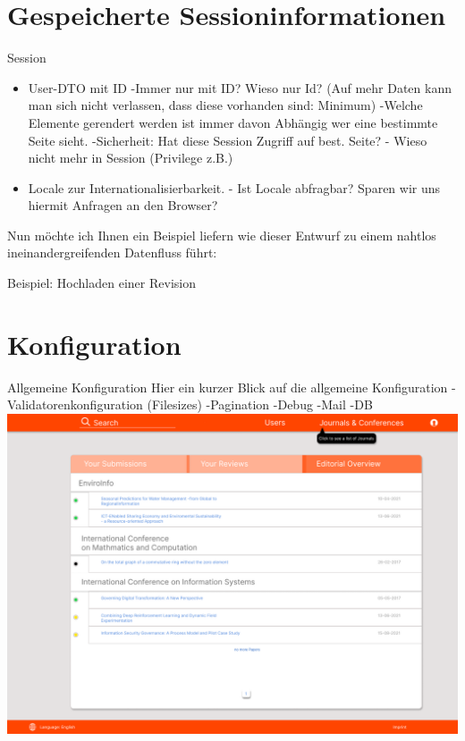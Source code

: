 \documentclass{beamer}
\begin{document}
    \section{Gespeicherte Sessioninformationen}

    \begin{frame}{Session}
        \begin{itemize}
            \item User-DTO mit ID
            -Immer nur mit ID? Wieso nur Id? (Auf mehr Daten kann man sich nicht verlassen, dass diese vorhanden sind: Minimum)
            -Welche Elemente gerendert werden ist immer davon Abhängig wer eine bestimmte Seite sieht.
            -Sicherheit: Hat diese Session Zugriff auf best. Seite?
            - Wieso nicht mehr in Session (Privilege z.B.)
            \pause
            \item Locale zur Internationalisierbarkeit.
            - Ist Locale abfragbar? Sparen wir uns hiermit Anfragen an den Browser?
        \end{itemize}

        Nun möchte ich Ihnen ein Beispiel liefern wie dieser Entwurf zu einem nahtlos ineinandergreifenden
        Datenfluss führt:
        \begin{frame}{Beispiel: Hochladen einer Revision}
        \end{frame}
    \end{frame}



    \section{Konfiguration}
    \begin{frame}{Allgemeine Konfiguration}
        Hier ein kurzer Blick auf die allgemeine Konfiguration
        -Validatorenkonfiguration (Filesizes)
        -Pagination
        -Debug
        -Mail
        -DB
        \centering
        \includegraphics[height=0.75\textheight]{../../docs/Pflichtenheft/graphics/Homepage-png}
    \end{frame}
\end{document}
